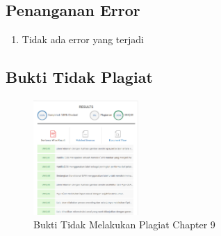 \subsection{Penanganan Error}
\begin{enumerate}
	\item Tidak ada error yang terjadi
\end{enumerate}

\subsection{Bukti Tidak Plagiat}
\begin{figure}[H]
\centering
	\includegraphics[width=4cm]{figures/1174035/chapter9/plagiat.png}
	\caption{Bukti Tidak Melakukan Plagiat Chapter 9}
\end{figure}
